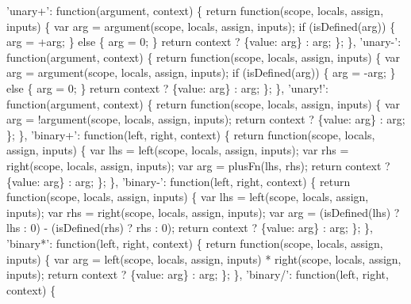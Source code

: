\begin{DoxyCodeInclude}
{{{  \textcolor{stringliteral}{'unary+'}: \textcolor{keyword}{function}(argument, context) \{
    \textcolor{keywordflow}{return} \textcolor{keyword}{function}(scope, locals, assign, inputs) \{
      var arg = argument(scope, locals, assign, inputs);
      \textcolor{keywordflow}{if} (isDefined(arg)) \{
        arg = +arg;
      \} \textcolor{keywordflow}{else} \{
        arg = 0;
      \}
      \textcolor{keywordflow}{return} context ? \{value: arg\} : arg;
    \};
  \},
  \textcolor{stringliteral}{'unary-'}: \textcolor{keyword}{function}(argument, context) \{
    \textcolor{keywordflow}{return} \textcolor{keyword}{function}(scope, locals, assign, inputs) \{
      var arg = argument(scope, locals, assign, inputs);
      \textcolor{keywordflow}{if} (isDefined(arg)) \{
        arg = -arg;
      \} \textcolor{keywordflow}{else} \{
        arg = 0;
      \}
      \textcolor{keywordflow}{return} context ? \{value: arg\} : arg;
    \};
  \},
  \textcolor{stringliteral}{'unary!'}: \textcolor{keyword}{function}(argument, context) \{
    \textcolor{keywordflow}{return} \textcolor{keyword}{function}(scope, locals, assign, inputs) \{
      var arg = !argument(scope, locals, assign, inputs);
      \textcolor{keywordflow}{return} context ? \{value: arg\} : arg;
    \};
  \},
  \textcolor{stringliteral}{'binary+'}: \textcolor{keyword}{function}(left, right, context) \{
    \textcolor{keywordflow}{return} \textcolor{keyword}{function}(scope, locals, assign, inputs) \{
      var lhs = left(scope, locals, assign, inputs);
      var rhs = right(scope, locals, assign, inputs);
      var arg = plusFn(lhs, rhs);
      \textcolor{keywordflow}{return} context ? \{value: arg\} : arg;
    \};
  \},
  \textcolor{stringliteral}{'binary-'}: \textcolor{keyword}{function}(left, right, context) \{
    \textcolor{keywordflow}{return} \textcolor{keyword}{function}(scope, locals, assign, inputs) \{
      var lhs = left(scope, locals, assign, inputs);
      var rhs = right(scope, locals, assign, inputs);
      var arg = (isDefined(lhs) ? lhs : 0) - (isDefined(rhs) ? rhs : 0);
      \textcolor{keywordflow}{return} context ? \{value: arg\} : arg;
    \};
  \},
  \textcolor{stringliteral}{'binary*'}: \textcolor{keyword}{function}(left, right, context) \{
    \textcolor{keywordflow}{return} \textcolor{keyword}{function}(scope, locals, assign, inputs) \{
      var arg = left(scope, locals, assign, inputs) * right(scope, locals, assign, inputs);
      \textcolor{keywordflow}{return} context ? \{value: arg\} : arg;
    \};
  \},
  \textcolor{stringliteral}{'binary/'}: \textcolor{keyword}{function}(left, right, context) \{
}}}
\end{DoxyCodeInclude}
